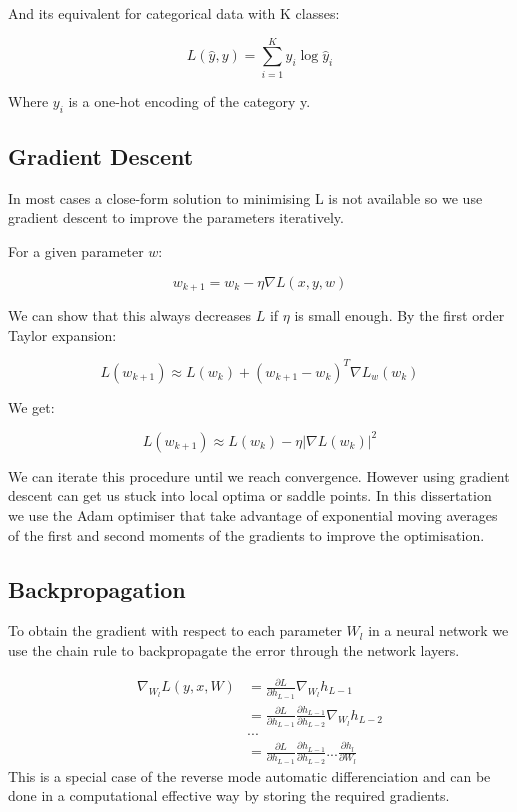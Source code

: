 \documentclass[11pt,oneside,openright]{report}
\begin{document}
And its equivalent for categorical data with K classes:

$$ L(\hat{y}, y) = \sum_{i=1}^K y_i \log \hat{y}_i $$

Where $y_i$ is a one-hot encoding of the category y.

\subsection{Gradient Descent}
In most cases a close-form solution to minimising L is not available so we use gradient descent to improve the parameters iteratively.

For a given parameter $w$:

$$ w_{k+1} = w_{k} - \eta \nabla L(x, y, w)$$

We can show that this always decreases $L$ if $\eta$ is small enough. By the first order Taylor expansion:

$$L(w_{k+1}) \approx L(w_{k}) + (w_{k+1} - w_{k})^T  \nabla L_{w}(w_{k}) $$

We get:

$$L(w_{k+1}) \approx L(w_{k}) - \eta | \nabla L(w_{k})|^2 $$

We can iterate this procedure until we reach convergence. However using gradient descent can get us stuck into local optima or saddle points. In this dissertation we use the Adam optimiser \cite{adam} that take advantage of exponential moving averages of the first and second moments of the gradients to improve the optimisation.

 \subsection{Backpropagation}
To obtain the gradient with respect to each parameter $W_l$ in a neural network we use the chain rule to backpropagate the error through the network layers.
 
 \begin{align}
   \nabla_{W_l} L(y, x, W) &= \frac{\partial L}{\partial h_{L-1}} \nabla_{W_l} h_{L-1}\\
   &= \frac{\partial L}{\partial h_{L-1}} \frac{\partial h_{L-1}}{\partial h_{L-2}} \nabla_{W_l} h_{L-2}\\
   &...\\
   &= \frac{\partial L}{\partial h_{L-1}} \frac{\partial h_{L-1}}{\partial h_{L-2}} ... \frac{\partial h_l}{\partial W_l}
 \end{align}
 This is a special case of the reverse mode automatic differenciation and can be done in a computational effective way by storing the required gradients.
\end{document}
